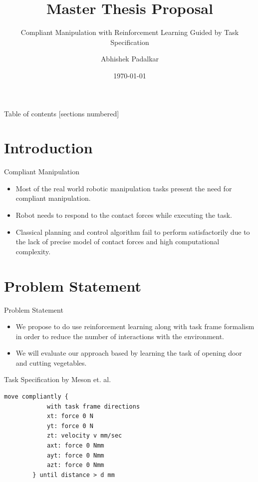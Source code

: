 \documentclass[10pt]{beamer}
\title{Master Thesis Proposal}
\subtitle{Compliant Manipulation with Reinforcement Learning Guided by Task Specification}
\date{\today}
\author{Abhishek Padalkar}
\institute{Hochschule Bonn-Rhein-Sieg, Sankt Augustin}
\begin{document}
\maketitle

\begin{frame}{Table of contents}
  [sections numbered]
  \tableofcontents[hideallsubsections]
\end{frame}

\section{Introduction}

\begin{frame}[fragile]{Compliant Manipulation}
	\begin{itemize}
		\item Most of the real world robotic manipulation tasks present the need for compliant manipulation.
		\item Robot needs to respond to the contact forces while executing the task. 
		\item Classical planning and control algorithm fail to perform satisfactorily due to the lack of precise model of contact forces and high computational complexity.
	\end{itemize}
\end{frame}

\section{Problem Statement}

\begin{frame}{Problem Statement}
	
	\begin{itemize}
		\item We propose to do use reinforcement learning along with task frame formalism in order to reduce the number of interactions with the environment.
		\item We will evaluate our approach based by learning the task of opening door and cutting vegetables.
	\end{itemize}
\end{frame}
\begin{frame}[fragile]{Task Specification by Meson et. al. \cite{mason1981compliance}}
	
	\begin{lstlisting}[label=tff,caption=Task Specification using TFF: Open Door]
		move compliantly {
			with task frame directions
			xt: force 0 N
			yt: force 0 N
			zt: velocity v mm/sec
			axt: force 0 Nmm
			ayt: force 0 Nmm
			azt: force 0 Nmm
		} until distance > d mm 
	\end{lstlisting}
	

\end{frame}
\end{document}
